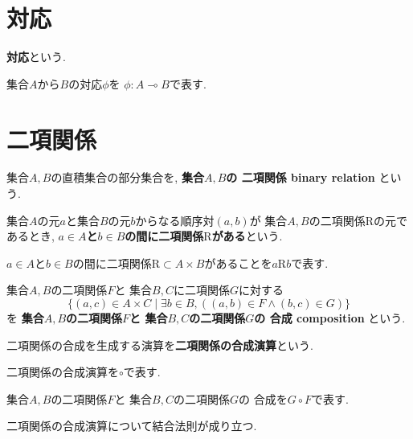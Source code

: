 \section{対応}
\begin{Def}
{\bf 対応}という.
\end{Def}
\begin{Notation}
集合$A$から$B$の対応$\phi$を
$\phi:A \multimap B$で表す.
\end{Notation}
\section{二項関係}
\begin{Def}
集合$A,B$の直積集合の部分集合を, 
{\bf 集合$A,B$の
二項関係 binary relation}
という.
\end{Def}
\begin{Def}
集合$A$の元$a$と集合$B$の元$b$からなる順序対$(a,b)$が
集合$A,B$の二項関係$\mathrm{R}$の元であるとき,
{\bf $a\in A$と$b\in B$の間に二項関係$\mathrm{R}$がある}という.
\end{Def}
\begin{Notation}
$a\in A$と$b\in B$の間に二項関係$\mathrm{R}\subset A\times B$があることを$a\mathrm{R}b$で表す.
\end{Notation}
\begin{Def}\label{Def:composition}
集合$A,B$の二項関係$F$と
集合$B,C$に二項関係$G$に対する
\[
\{(a,c)\in A\times C\mid \exists b\in B, ((a,b)\in F \land (b,c)\in G)\}
\]
を
{\bf 集合$A,B$の二項関係$F$と
集合$B,C$の二項関係$G$の
合成 composition
}という.
\end{Def}
\begin{Def}
二項関係の合成を生成する演算を{\bf 二項関係の合成演算}という.
\end{Def}
\begin{Notation}
二項関係の合成演算を$\circ$で表す.
\end{Notation}
\begin{Notation}
集合$A,B$の二項関係$F$と
集合$B,C$の二項関係$G$の
合成を$G\circ F$で表す.
\end{Notation}
\begin{thm}
二項関係の合成演算について結合法則が成り立つ.
\end{thm}
\begin{comment}
\begin{Prop}\label{Prop:binary relation composition}
二項関係$F\subset A\times B ,G\subset B\times C, H\subset C\times D$について
\[
(H\circ G)\circ F=H\circ (G\circ F)
\]
が成り立つ.
すなわち, 任意の$(a,d)\in A\times D$について
\begin{align*}
(a,d)\in (H\circ G)\circ F \Leftrightarrow (a,d)\in H\circ(G\circ F)
\end{align*}
が成り立つ.
\end{Prop}
\end{comment}
